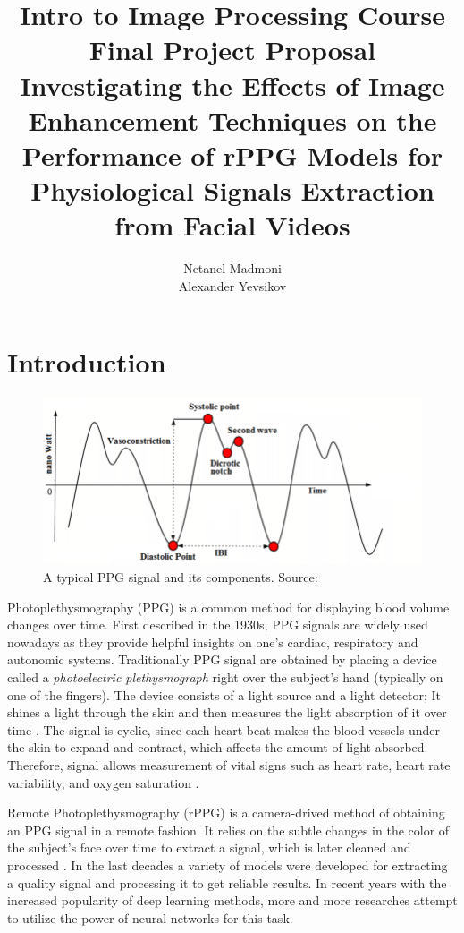 \documentclass{article}
\author{Netanel Madmoni \\ Alexander Yevsikov}
\title{Intro to Image Processing Course Final Project Proposal \\
\large Investigating the Effects of Image Enhancement Techniques 
on the Performance of rPPG Models for
Physiological Signals Extraction from Facial Videos}
\begin{document}
\maketitle

\section*{Introduction}

\begin{figure}
	\includegraphics[scale=0.25]{figures/A-typical-PPG-signal-and-its-components.png}
	\caption{A typical PPG signal and its components. Source: \cite{nathPhotoplethysmogramBasedNonInvasive2018}}
\end{figure}

Photoplethysmography (PPG) is a common method for displaying blood volume changes over time. First described in the 1930s, PPG signals are widely used nowadays as they provide helpful insights on one's cardiac, respiratory and autonomic systems. Traditionally PPG signal are obtained by placing a device called a \textit{photoelectric plethysmograph} right over the subject's hand (typically on one of the fingers). The device consists of a light source and a light detector; It shines a light through the skin and then measures the light absorption of it over time \cite{alianPhotoplethysmography2014}. The signal is cyclic, since each heart beat makes the blood vessels under the skin to expand and contract, which affects the amount of light absorbed. Therefore, signal allows measurement of vital signs such as heart rate, heart rate variability, and oxygen saturation \cite{pirzadaRemotePhotoplethysmographyRPPG2023}.

Remote Photoplethysmography (rPPG) is a camera-drived method of obtaining an PPG signal in a remote fashion. It relies on the subtle changes in the color of the subject's face over time to extract a signal, which is later cleaned and processed \cite{pirzadaRemotePhotoplethysmographyRPPG2023}. In the last decades a variety of models were developed for extracting a quality signal and processing it to get reliable results. In recent years with the increased popularity of deep learning methods, more and more researches attempt to utilize the power of neural networks for this task.
\end{document}
